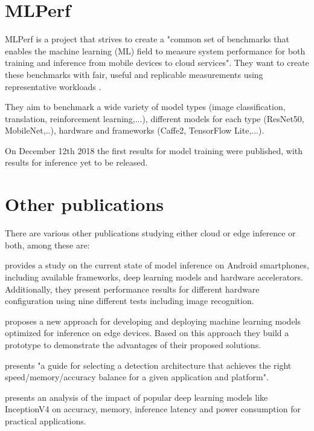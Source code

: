 \section{MLPerf}
MLPerf is a project that strives to create a "common set of benchmarks that enables the machine learning (ML) field to measure system performance for both training and inference from mobile devices to cloud services"\cite{mlperfWebsite}.
They want to create these benchmarks with fair, useful and replicable  measurements using representative workloads \cite{mlperf}. 

They aim to benchmark a wide variety of model types (image classification, translation, reinforcement learning,...), different models for each type (ResNet50, MobileNet,..), hardware and frameworks (Caffe2, TensorFlow Lite,...).

On December 12th 2018 the first results for model training were published, with results for inference yet to be released.


\section{Other publications}
There are various other publications studying either cloud or edge inference or both, among these are:



\cite{DBLP:journals/corr/abs-1810-01109} provides a study on the current state of model inference on Android smartphones, including available frameworks, deep learning models and hardware accelerators. Additionally, they present performance results for different hardware configuration using nine different tests including image recognition.

\cite{rethinkingDeployment} proposes a new approach for developing and deploying machine learning models optimized for inference on edge devices. Based on this approach they build a prototype to demonstrate the advantages of their proposed solutions.


\cite{DBLP:journals/corr/HuangRSZKFFWSG016} presents "a guide for selecting a detection architecture that achieves the right
speed/memory/accuracy balance for a given application and platform"\cite{DBLP:journals/corr/HuangRSZKFFWSG016}.



\cite{DBLP:journals/corr/CanzianiPC16} presents an analysis of the impact of popular deep learning models like InceptionV4 on accuracy, memory, inference latency and power consumption for practical applications.


